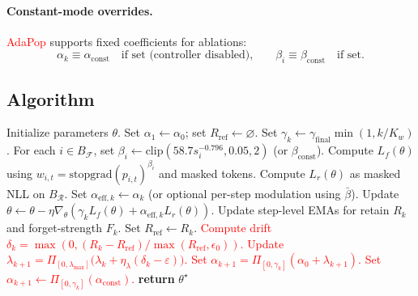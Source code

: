   \paragraph{Constant-mode overrides.}
  \textcolor{red}{AdaPop} supports fixed coefficients for ablations:
  \[
  \alpha_k \equiv \alpha_{\mathrm{const}} \quad \text{if set (controller disabled),}
  \qquad
  \beta_i \equiv \beta_{\mathrm{const}} \quad \text{if set.}
  \]

  \subsection{Algorithm}

  \begin{algorithm}[H]
  \caption{\textcolor{red}{AdaPop}}
  \begin{algorithmic}[1]
  \STATE Initialize parameters $\theta$.
  \STATE Set $\alpha_1\leftarrow \alpha_0$; set $R_{\mathrm{ref}}\leftarrow \varnothing$.
    \STATE Set $\gamma_k \leftarrow \gamma_{\mathrm{final}}\min(1,k/K_w)$.
      \STATE For each $i\in B_{\mathcal{F}}$, set $\beta_i \leftarrow \mathrm{clip}(58.7 s_i^{-0.796},0.05,2)$ (or $\beta_{\mathrm{const}}$).
      \STATE Compute $L_f(\theta)$ using $w_{i,t}=\mathrm{stopgrad}(p_{i,t})^{\beta_i}$ and masked tokens.
      \STATE Compute $L_r(\theta)$ as masked NLL on $B_{\mathcal{R}}$.
      \STATE Set $\alpha_{\mathrm{eff},k}\leftarrow \alpha_k$ (or optional per-step modulation using $\bar{\beta}$).
      \STATE Update $\theta\leftarrow\theta-\eta\nabla_\theta(\gamma_k L_f(\theta)+\alpha_{\mathrm{eff},k}L_r(\theta))$.
      \STATE Update step-level EMAs for retain $R_k$ and forget-strength $F_k$.
    \ENDFOR
    \STATE Set $R_{\mathrm{ref}}\leftarrow R_k$.
    \ENDIF
    \STATE \textcolor{red}{Compute drift $\delta_k=\max(0,(R_k-R_{\mathrm{ref}})/\max(R_{\mathrm{ref}},\epsilon_0))$.}
      \STATE \textcolor{red}{Update $\lambda_{k+1}=\Pi_{[0,\lambda_{\max}]}\big(\lambda_k+\eta_\lambda(\delta_k-\varepsilon)\big)$.}
      \STATE \textcolor{red}{Set $\alpha_{k+1}=\Pi_{[0,\gamma_k]}(\alpha_0+\lambda_{k+1})$.}
    \ELSE
      \STATE \textcolor{red}{Set $\alpha_{k+1}\leftarrow \Pi_{[0,\gamma_k]}(\alpha_{\mathrm{const}})$.}
    \ENDIF
  \ENDFOR
  \STATE \textbf{return} $\theta^\star$
  \end{algorithmic}
  \end{algorithm}

  

